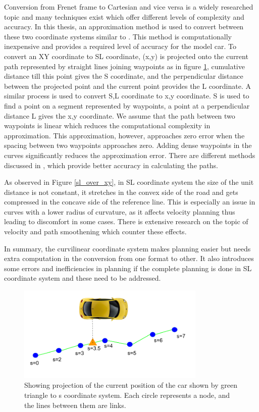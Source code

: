  Conversion from Frenet frame to Cartesian and vice versa is a widely researched topic and many techniques exist which offer different levels of complexity and accuracy. In this thesis, an approximation method is used to convert between these two coordinate systems similar to \cite{volvo_reactive_traj}. This method is computationally inexpensive and provides a required level of accuracy for the model car. To convert an XY coordinate to SL coordinate, (x,y) is projected onto the current path represented by straight lines joining waypoints as in figure \ref{xy_sl_conversion}, cumulative distance till this point gives the S coordinate, and the perpendicular distance between the projected point and the current point provides the L coordinate. A similar process is used to convert S,L coordinate to x,y coordinate. S is used to find a point on a segment represented by waypoints, a point at a perpendicular distance L gives the x,y coordinate. We assume that the path between two waypoints is linear which reduces the computational complexity in approximation. This approximation, however, approaches zero error when the spacing between two waypoints approaches zero. Adding dense waypoints in the curves significantly reduces the approximation error. There are different methods discussed in \cite{lengthparameterized}, \cite{Wangrobustand} which provide better accuracy in calculating the paths. 

As observed in Figure \ref{sl_over_xy}, in SL coordinate system the size of the unit distance is not constant, it stretches in the convex side of the road and gets compressed in the concave side of the reference line. This is especially an issue in curves with a lower radius of curvature, as it affects velocity planning thus leading to discomfort in some cases. There is extensive research on the topic of velocity and path smoothening which counter these effects. 

In summary, the curvilinear coordinate system makes planning easier but needs extra computation in the conversion from one format to other. It also introduces some errors and inefficiencies in planning if the complete planning is done in SL coordinate system and these need to be addressed. 
 
 \begin{figure}
    \centering
    \includegraphics[width=0.8\textwidth]{Images/xy_sl_conversion.png}
    \caption{Showing projection of the current position of the car shown by green triangle to s coordinate system. Each circle represents a node, and the lines between them are links. \cite{volvo_reactive_traj}}
    \label{xy_sl_conversion}
\end{figure}

